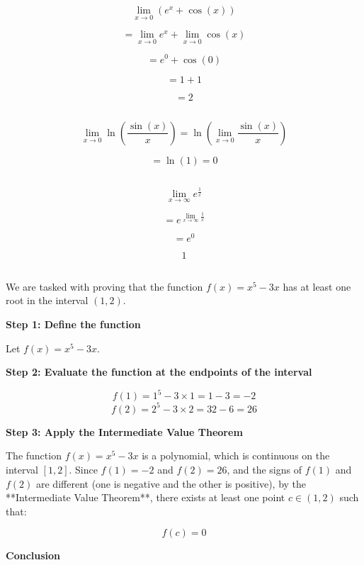 \documentclass{article}
\begin{document}
\[
\lim_{x \to 0} \left( e^x + \cos(x) \right)
\]

\[
= \lim_{x \to 0} e^x + \lim_{x \to 0} \cos(x)
\]

\[
= e^0 + \cos(0)
\]

\[
= 1 + 1
\]

\[
=\boxed{2}
\]



	\subsection{}

\[
\lim_{x \to 0} \ln\left( \frac{\sin(x)}{x} \right) = \ln\left( \lim_{x \to 0} \frac{\sin(x)}{x} \right)
\]

\[
= \ln(1) = \boxed{0}
\]

\subsection{}
\[
\lim_{x \to \infty} e^{\frac{1}{x}}
\]

\[
= e^{\lim_{x \to \infty} \frac{1}{x}}
\]

\[
= e^0
\]

\[
\boxed{1}
\]


\subsection{}
We are tasked with proving that the function \( f(x) = x^5 - 3x \) has at least one root in the interval \( (1, 2) \).

\textbf{Step 1: Define the function}

Let \( f(x) = x^5 - 3x \).

\textbf{Step 2: Evaluate the function at the endpoints of the interval}

\[
f(1) = 1^5 - 3 \times 1 = 1 - 3 = -2
\]
\[
f(2) = 2^5 - 3 \times 2 = 32 - 6 = 26
\]

\textbf{Step 3: Apply the Intermediate Value Theorem}

The function \( f(x) = x^5 - 3x \) is a polynomial, which is continuous on the interval \( [1, 2] \). Since \( f(1) = -2 \) and \( f(2) = 26 \), and the signs of \( f(1) \) and \( f(2) \) are different (one is negative and the other is positive), by the **Intermediate Value Theorem**, there exists at least one point \( c \in (1, 2) \) such that:

\[
f(c) = 0
\]

\textbf{Conclusion}
\end{document}
